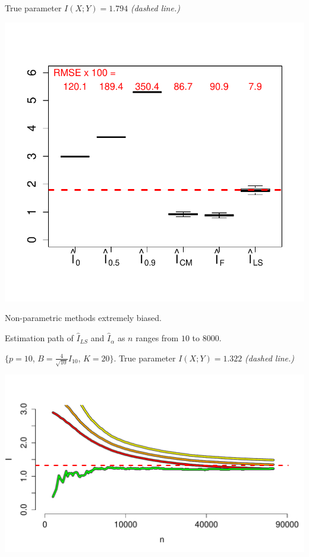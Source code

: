 \documentclass{article}
\begin{document}
True parameter $I(X; Y) = 1.794$ \emph{(dashed line.)}
\begin{center}
\includegraphics[scale = 0.5, clip = true, trim = 0 0.5in 0 0.5in]{../info_theory_sims/fig2.pdf}
\end{center}
Non-parametric methods extremely biased.

Estimation path of $\hat{I}_{LS}$ and $\hat{I}_\alpha$ as $n$ ranges from $10$ to $8000$.

\small{$\{p = 10$, $B = \frac{4}{\sqrt{10}} I_{10}$, $K = 20\}$.
True parameter $I(X; Y) = 1.322$ \emph{(dashed line.)}}

\begin{center}
\includegraphics[scale = 0.4]{../info_theory_sims/fig3.pdf}
\end{center}
\end{document}
